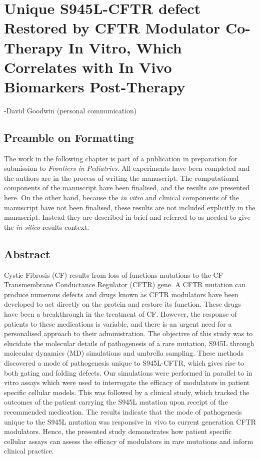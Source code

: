 \chapter{Unique S945L-CFTR defect Restored by CFTR Modulator Co-Therapy In Vitro, Which Correlates with In Vivo Biomarkers Post-Therapy}
\label{chap:S945L}

\setcounter{figure}{0}
\renewcommand{\thefigure}{\arabic{chapter}.\arabic{figure}}

 {-David Goodwin (personal communication)}


\section*{\centering Preamble on Formatting} 
The work in the following chapter is part of a publication in preparation for submission to \textit{Frontiers in Pediatrics}. All experiments have been completed and the authors are in the process of writing the manuscript. The computational components of the manuscript have been finalised, and the results are presented here. On the other hand, because the \textit{in vitro} and clinical components of the manuscript have not been finalised, these results are not included explicitly in the manuscript. Instead they are described in brief and referred to as needed to give the \textit{in silico} results context.

\section*{\centering Abstract} 

Cystic Fibrosis (CF) results from loss of functions mutations to the CF Transmembrane Conductance Regulator (CFTR) gene. A CFTR mutation can produce numerous defects and drugs known as CFTR modulators have been developed to act directly on the protein and restore its function. These drugs have been a breakthrough in the treatment of CF. However, the response of patients to these medications is variable, and there is an urgent need for a personalised approach to their administration. The objective of this study was to elucidate the molecular details of pathogenesis of a rare mutation, S945L through molecular dynamics (MD) simulations and umbrella sampling. These methods discovered a mode of pathogenesis unique to S945L-CFTR, which gives rise to both gating and folding defects. Our simulations were performed in parallel to in vitro assays which were used to interrogate the efficacy of modulators in patient specific cellular models. This was followed by a clinical study, which tracked the outcomes of the patient carrying the S945L mutation upon receipt of the recommended medication. The results indicate that the mode of pathogenesis unique to the S945L mutation was responsive in vivo to current generation CFTR modulators. Hence, the presented study demonstrates how patient specific cellular assays can assess the efficacy of modulators in rare mutations and inform clinical practice.


